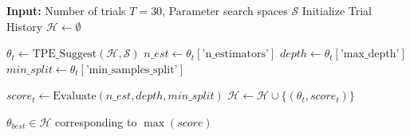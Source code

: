 \documentclass[12pt, a4paper]{article}
\begin{document}
\begin{algorithm}[H]
\caption{Optuna Optimization Loop}
\begin{algorithmic}[1]
\State \textbf{Input:} Number of trials $T=30$, Parameter search spaces $\mathcal{S}$
\State Initialize Trial History $\mathcal{H} \leftarrow \emptyset$

    \State $\theta_t \leftarrow \text{TPE\_Suggest}(\mathcal{H}, \mathcal{S})$ 
    \State $n\_est \leftarrow \theta_t[\text{'n\_estimators'}]$
    \State $depth \leftarrow \theta_t[\text{'max\_depth'}]$
    \State $min\_split \leftarrow \theta_t[\text{'min\_samples\_split'}]$
    
    \State $score_t \leftarrow \text{Evaluate}(n\_est, depth, min\_split)$
    \State $\mathcal{H} \leftarrow \mathcal{H} \cup \{(\theta_t, score_t)\}$ 
\EndFor

\State \Return $\theta_{best} \in \mathcal{H}$ corresponding to $\max(score)$
\end{algorithmic}
\end{algorithm}
\end{document}
